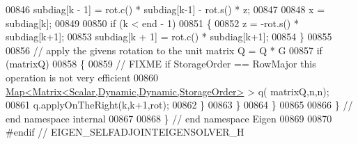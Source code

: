 \begin{DoxyCode}
00846       subdiag[k - 1] = rot.c() * subdiag[k-1] - rot.s() * z;
00847 
00848     x = subdiag[k];
00849 
00850     \textcolor{keywordflow}{if} (k < end - 1)
00851     \{
00852       z = -rot.s() * subdiag[k+1];
00853       subdiag[k + 1] = rot.c() * subdiag[k+1];
00854     \}
00855     
00856     \textcolor{comment}{// apply the givens rotation to the unit matrix Q = Q * G}
00857     \textcolor{keywordflow}{if} (matrixQ)
00858     \{
00859       \textcolor{comment}{// FIXME if StorageOrder == RowMajor this operation is not very efficient}
00860       \hyperlink{group___core___module_class_eigen_1_1_map}{Map<Matrix<Scalar,Dynamic,Dynamic,StorageOrder>} > q(
      matrixQ,n,n);
00861       q.applyOnTheRight(k,k+1,rot);
00862     \}
00863   \}
00864 \}
00865 
00866 \} \textcolor{comment}{// end namespace internal}
00867 
00868 \} \textcolor{comment}{// end namespace Eigen}
00869 
00870 \textcolor{preprocessor}{#endif // EIGEN\_SELFADJOINTEIGENSOLVER\_H}
\end{DoxyCode}
